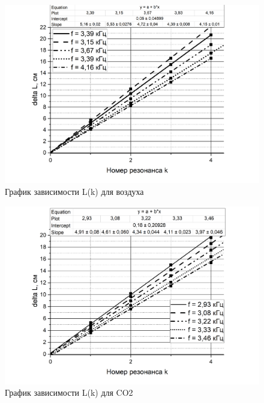 \documentclass[a4paper,12pt]{article} %
\begin{document}
\begin{figure}[!h]
 	\centering
 	\includegraphics[width=1\linewidth]{воздух.png}
 	\caption[]{График зависимости L(k) для воздуха}
 
 \end{figure}
 
\begin{figure}[!h]
 	\centering
 	\includegraphics[width=1\linewidth]{CO2.png}
 	\caption[]{График зависимости L(k) для CO2}
 	
 \end{figure} 
 
\end{document}

